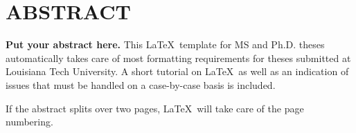\chapter*{ABSTRACT}

{\bf Put your abstract here.}
This \LaTeX \ template for MS and Ph.D. theses automatically 
takes care of most formatting requirements for theses submitted 
at Louisiana Tech University.
A short tutorial on \LaTeX \ 
as well as an indication of issues that must be 
handled on a case-by-case basis is included.

If the abstract splits over two pages, \LaTeX\ will
take care of the page numbering.
